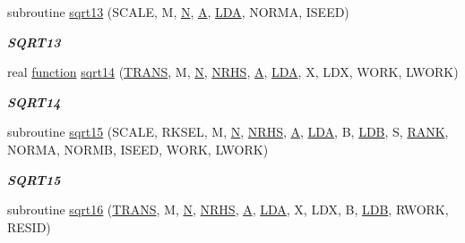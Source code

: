 \begin{DoxyCompactItemize}
subroutine \hyperlink{group__single__lin_ga8d7580685a1898f93b5ac843aab10b42}{sqrt13} (S\+C\+A\+L\+E, M, \hyperlink{polmisc_8c_a0240ac851181b84ac374872dc5434ee4}{N}, \hyperlink{classA}{A}, \hyperlink{example__user_8c_ae946da542ce0db94dced19b2ecefd1aa}{L\+D\+A}, N\+O\+R\+M\+A, I\+S\+E\+E\+D)
\begin{DoxyCompactList}\small\item\em {\bfseries S\+Q\+R\+T13} \end{DoxyCompactList}\item 
real \hyperlink{afunc_8m_a7b5e596df91eadea6c537c0825e894a7}{function} \hyperlink{group__single__lin_ga5bb864528fd09c06898fc2e9512d2d10}{sqrt14} (\hyperlink{superlu__enum__consts_8h_a0c4e17b2d5cea33f9991ccc6a6678d62a1f61e3015bfe0f0c2c3fda4c5a0cdf58}{T\+R\+A\+N\+S}, M, \hyperlink{polmisc_8c_a0240ac851181b84ac374872dc5434ee4}{N}, \hyperlink{example__user_8c_aa0138da002ce2a90360df2f521eb3198}{N\+R\+H\+S}, \hyperlink{classA}{A}, \hyperlink{example__user_8c_ae946da542ce0db94dced19b2ecefd1aa}{L\+D\+A}, X, L\+D\+X, W\+O\+R\+K, L\+W\+O\+R\+K)
\begin{DoxyCompactList}\small\item\em {\bfseries S\+Q\+R\+T14} \end{DoxyCompactList}\item 
subroutine \hyperlink{group__single__lin_gaae4d0824738bd82d82585a131670bec3}{sqrt15} (S\+C\+A\+L\+E, R\+K\+S\+E\+L, M, \hyperlink{polmisc_8c_a0240ac851181b84ac374872dc5434ee4}{N}, \hyperlink{example__user_8c_aa0138da002ce2a90360df2f521eb3198}{N\+R\+H\+S}, \hyperlink{classA}{A}, \hyperlink{example__user_8c_ae946da542ce0db94dced19b2ecefd1aa}{L\+D\+A}, B, \hyperlink{example__user_8c_a50e90a7104df172b5a89a06c47fcca04}{L\+D\+B}, S, \hyperlink{splinemodule_8c_a3a88bcc63386de30443dacede2e01847}{R\+A\+N\+K}, N\+O\+R\+M\+A, N\+O\+R\+M\+B, I\+S\+E\+E\+D, W\+O\+R\+K, L\+W\+O\+R\+K)
\begin{DoxyCompactList}\small\item\em {\bfseries S\+Q\+R\+T15} \end{DoxyCompactList}\item 
subroutine \hyperlink{group__single__lin_gaeb5e0f4045ce700528641b4ecfa4c4f8}{sqrt16} (\hyperlink{superlu__enum__consts_8h_a0c4e17b2d5cea33f9991ccc6a6678d62a1f61e3015bfe0f0c2c3fda4c5a0cdf58}{T\+R\+A\+N\+S}, M, \hyperlink{polmisc_8c_a0240ac851181b84ac374872dc5434ee4}{N}, \hyperlink{example__user_8c_aa0138da002ce2a90360df2f521eb3198}{N\+R\+H\+S}, \hyperlink{classA}{A}, \hyperlink{example__user_8c_ae946da542ce0db94dced19b2ecefd1aa}{L\+D\+A}, X, L\+D\+X, B, \hyperlink{example__user_8c_a50e90a7104df172b5a89a06c47fcca04}{L\+D\+B}, R\+W\+O\+R\+K, R\+E\+S\+I\+D)

\end{DoxyCompactItemize}
